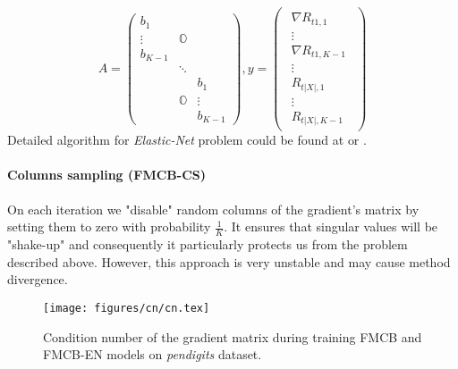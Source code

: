 \documentclass{article}
\begin{document}
\[
A =
\begin{pmatrix}
	b_{1}     		& 				&		  \\
	\vdots			& \mathbb{O}  	&		  \\
	b_{K-1}			& 				&		  \\
					& \ddots		&		  \\
					&   			& b_{1}	  \\
					& \mathbb{O}	& \vdots  \\
					& 				& b_{K-1}
\end{pmatrix},
y=\begin{pmatrix}\begin{array}{l}
	\nabla R_{t1,1}		\\
	\vdots				\\
	\nabla R_{t1,K-1}	\\

	\vdots				\\
	
	R_{t|X|,1}		\\
	\vdots				\\
	R_{t|X|,K-1}
\end{array}\end{pmatrix}
\]
Detailed algorithm for \emph{Elastic-Net} problem could be found at \cite{elasticnet05} or \cite{Hastie_theelements}.

\paragraph{Columns sampling (FMCB-CS)}
On each iteration we "disable" random columns of the gradient's matrix by setting them to zero with probability $\frac{1}{K}$. It ensures that singular values will be "shake-up" and consequently it particularly protects us from the problem described above. However, this approach is very unstable and may cause method divergence.

\begin{figure}
\vskip 0.2in
\begin{center}
\centerline{\texttt{[image: figures/cn/cn.tex]}}
\caption{Condition number of the gradient matrix during training FMCB and FMCB-EN models on \emph{pendigits} dataset.}
\end{center}
\label{fig:condition_number}
\vskip -0.2in
\end{figure}
\end{document}
